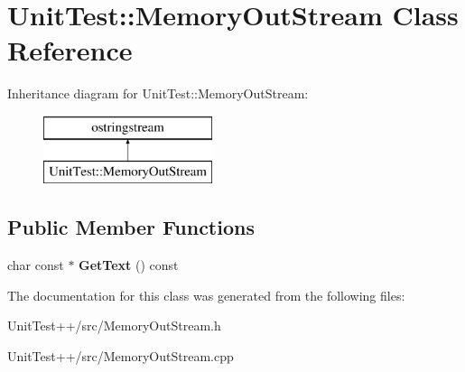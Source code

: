 \hypertarget{classUnitTest_1_1MemoryOutStream}{\section{Unit\-Test\-:\-:Memory\-Out\-Stream Class Reference}
\label{classUnitTest_1_1MemoryOutStream}
}
Inheritance diagram for Unit\-Test\-:\-:Memory\-Out\-Stream\-:\begin{figure}[H]
\begin{center}
\leavevmode
\includegraphics[height=2.000000cm]{classUnitTest_1_1MemoryOutStream}
\end{center}
\end{figure}
\subsection*{Public Member Functions}
\begin{DoxyCompactItemize}
\item 
\hypertarget{classUnitTest_1_1MemoryOutStream_abe5b2a99f08eca4abad1d8dc95365635}{char const $\ast$ {\bfseries Get\-Text} () const }\label{classUnitTest_1_1MemoryOutStream_abe5b2a99f08eca4abad1d8dc95365635}

\end{DoxyCompactItemize}


The documentation for this class was generated from the following files\-:\begin{DoxyCompactItemize}
\item 
Unit\-Test++/src/Memory\-Out\-Stream.\-h\item 
Unit\-Test++/src/Memory\-Out\-Stream.\-cpp\end{DoxyCompactItemize}
